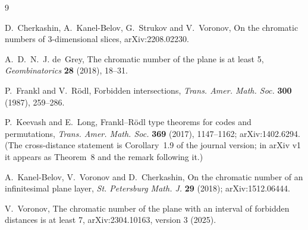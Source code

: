 \documentclass[11pt]{amsart}
\theoremstyle{definition}
\theoremstyle{remark}
\begin{document}
\begin{thebibliography}{9}

D.~Cherkashin, A.~Kanel-Belov, G.~Strukov and V.~Voronov, On the chromatic numbers of
3-dimensional slices, arXiv:2208.02230.

A.~D.~N.~J. de~Grey, The chromatic number of the plane is at least 5,
\emph{Geombinatorics} \textbf{28} (2018), 18--31.

P.~Frankl and V.~R\"odl, Forbidden intersections,
\emph{Trans. Amer. Math. Soc.} \textbf{300} (1987), 259--286.

P.~Keevash and E.~Long, Frankl--R\"odl type theorems for codes and permutations,
\emph{Trans. Amer. Math. Soc.} \textbf{369} (2017), 1147--1162; arXiv:1402.6294.
(The cross-distance statement is Corollary~1.9 of the journal version; in arXiv v1 it appears
as Theorem~8 and the remark following it.)

A.~Kanel-Belov, V.~Voronov and D.~Cherkashin, On the chromatic number of an infinitesimal plane
layer, \emph{St. Petersburg Math. J.} \textbf{29} (2018); arXiv:1512.06444.

V.~Voronov, The chromatic number of the plane with an interval of forbidden distances is at
least 7, arXiv:2304.10163, version 3 (2025).

\end{thebibliography}
\end{document}
